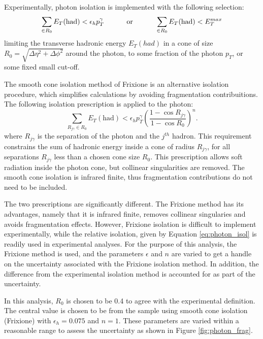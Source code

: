 \documentclass[11pt,a4paper,openright,twoside]{report}
\begin{document}
Experimentally, photon isolation is implemented with the following selection:
\begin{equation}
\sum_{\in R_0} E_T(\text{had}) < \epsilon_h p_T^\gamma \text{\hspace{1cm} or \hspace{1cm}} \sum_{\in R_0} E_T(\text{had}) < E_T^{max}
\end{equation}
\label{eq:photon_isol}
limiting the transverse hadronic energy $E_T(had)$ in a cone of size $R_0 = \sqrt{\Delta\eta^2 + \Delta\phi^2}$ around the photon, to some fraction of the photon $p_T$, or some fixed small cut-off.

The smooth cone isolation method of Frixione \cite{frixione} is an alternative isolation procedure, which simplifies calculations by avoiding fragmentation contribuitions. The following isolation prescription is applied to the photon:
\begin{equation}
	\sum_{R_{j\gamma} \in R_0} E_T(\text{had}) < \epsilon_h p_T^\gamma \left(\frac{1-\cos R_{j\gamma}}{1-\cos R_0}\right)^n.
\end{equation}
\label{eq:frix_isol}
where $R_{j\gamma}$ is the separation of the photon and the $j^{th}$ hadron. This requirement constrains the sum of hadronic energy inside a cone of radius $R_{j\gamma}$, for all separations $R_{j\gamma}$ less than a chosen cone size $R_0$. This prescription allows soft radiation inside the photon cone, but collinear singularities are removed. The smooth cone isolation is infrared finite, thus fragmentation contributions do not need to be included. 

The two prescriptions are significantly different. The Frixione method has its advantages, namely that it is infrared finite, removes collinear singularies and avoids fragmentation effects. However, Frixione isolation is difficult to implement experimentally, while the relative isolation, given by Equation \ref{eq:photon_isol} is readily used in experimental analyses. For the purpose of this analysis, the Frixione method is used, and the parameters $\epsilon$ and $n$ are varied to get a handle on the uncertainty associated with the Frixione isolation method. In addition, the difference from the experimental isolation method is accounted for as part of the uncertainty.

In this analysis, $R_0$ is chosen to be 0.4 to agree with the experimental definition. The central value is chosen to be from the sample using smooth cone isolation (Frixione) with $\epsilon_h = 0.075$ and $n=1$. These parameters are varied within a reasonable range to assess the uncertainty as shown in Figure \ref{fig:photon_frag}.
\end{document}
